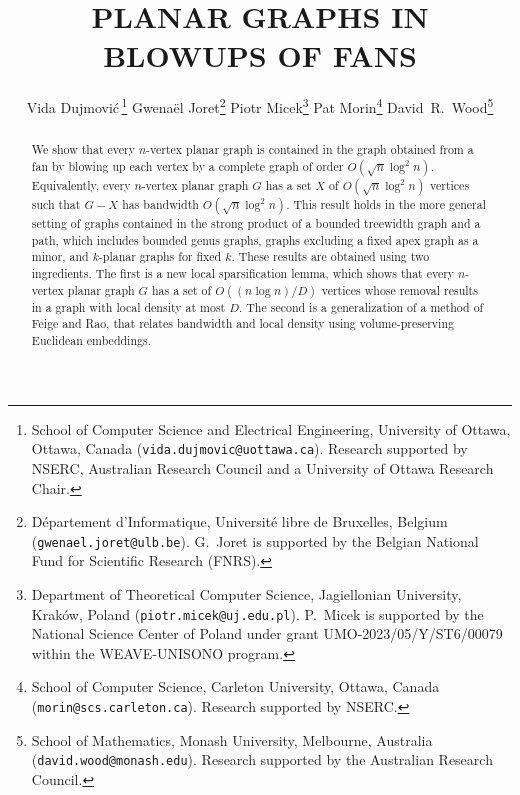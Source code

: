 \documentclass{patmorin}
\title{\MakeUppercase{\boldmath Planar graphs in blowups of fans}}
\author{
 Vida Dujmovi{\'c}\,\footnote{School of Computer Science and Electrical Engineering, University of Ottawa, Ottawa, Canada (\texttt{vida.dujmovic@uottawa.ca}). Research supported by NSERC, Australian Research Council and a University of Ottawa Research Chair.}
 \qquad
 Gwena\"el Joret\footnote{D\'epartement d'Informatique, Universit\'e libre de Bruxelles, Belgium ({\tt gwenael.joret@ulb.be}). G.\ Joret is supported by the Belgian National Fund for Scientific Research (FNRS).}
 \qquad
 Piotr Micek\footnote{Department of Theoretical Computer Science, Jagiellonian University, Kraków, Poland (\texttt{piotr.micek@uj.edu.pl}). 
 P.\ Micek is supported by the National Science Center of Poland under grant UMO-2023/05/Y/ST6/00079 within the WEAVE-UNISONO program.}
 \qquad
 Pat Morin\footnote{School of Computer Science, Carleton University, Ottawa, Canada (\texttt{morin@scs.carleton.ca}). Research supported by NSERC.}
 \qquad
 David~R.~Wood\footnote{School of Mathematics, Monash University, Melbourne, Australia (\texttt{david.wood@monash.edu}). Research supported by the Australian Research Council.}
 }
\date{}
\begin{document}
\begin{titlepage}
\maketitle




%
%
%



\begin{abstract}
  We show that every $n$-vertex planar graph is contained in the graph obtained from a fan by blowing up each vertex by a complete graph of order $O(\sqrt{n}\log^2 n)$.  Equivalently, every $n$-vertex planar graph $G$ has a set $X$ of $O(\sqrt{n}\log^2 n)$ vertices such that $G-X$ has bandwidth $O(\sqrt{n}\log^2 n)$. This result holds in the more general setting of graphs contained in the strong product of a bounded treewidth graph and a path, which includes bounded genus graphs, graphs excluding a fixed apex graph as a minor, and $k$-planar graphs for fixed $k$. These results are obtained using two ingredients.  The first is a new local sparsification lemma, which shows that every $n$-vertex planar graph $G$ has a set of $O((n\log n)/D)$ vertices whose removal results in a graph with local density at most $D$. The second is a generalization of a method of Feige and Rao, that relates bandwidth and local density using volume-preserving Euclidean embeddings.
\end{abstract}
\end{titlepage}
\end{document}

